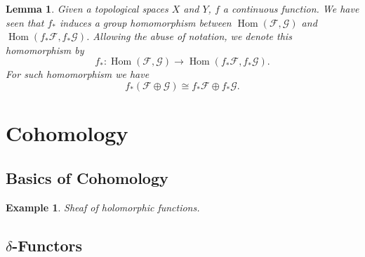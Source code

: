 \documentclass{article}
\newtheorem{lemma}{Lemma}[section]
\newtheorem{example}{Example}[section]
\numberwithin{equation}{section}
\DeclareMathOperator{\Hom}{Hom}
\begin{document}
\begin{lemma}
Given a topological spaces $X$ and $Y$, $f$ a continuous function. We have seen that $f_*$ induces a group homomorphism between $\Hom(\mathcal{F},\mathcal{G})$ and $\Hom(f_*\mathcal{F},f_*\mathcal{G})$. Allowing the abuse of notation, we denote this homomorphism by 
\begin{equation*}
f_*:\Hom(\mathcal{F},\mathcal{G})\to\Hom(f_*\mathcal{F},f_*\mathcal{G}).
\end{equation*}
For such homomorphism we have
\begin{equation*}
f_*(\mathcal{F}\oplus\mathcal{G}) \cong f_*\mathcal{F}\oplus f_*\mathcal{G}.
\end{equation*}
\end{lemma}

\section{Cohomology}


\subsection{Basics of Cohomology}


\begin{example}
Sheaf of holomorphic functions.
\end{example}

\subsection{$\delta$-Functors}
\end{document}

